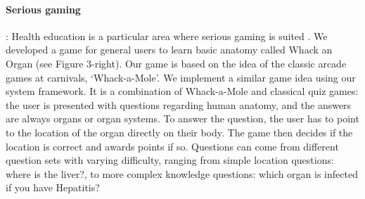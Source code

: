 \paragraph{Serious gaming}: Health education is a particular area where serious gaming is suited \cite{Aubin2012,Jonas2012}. We developed a game for general users to learn basic anatomy called Whack an Organ (see Figure 3-right). Our game is based on the idea of the classic arcade games at carnivals, ‘Whack-a-Mole’. We implement a similar game idea using our system framework. It is a combination of Whack-a-Mole and classical quiz games: the user is presented with questions regarding human anatomy, and the answers are always organs or organ systems. To answer the question, the user has to point to the location of the organ directly on their body. The game then decides if the location is correct and awards points if so. Questions can come from different question sets with varying difficulty, ranging from simple location questions: where is the liver?, to more complex knowledge questions: which organ is infected if you have Hepatitis? 